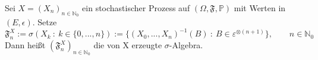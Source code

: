 Sei $X=(X_{n})_{n \in \mathbb{N}_{0}}$ ein stochastischer Prozess auf $(\Omega,\mathfrak{F},\mathbb{P})$ mit Werten in $(E,\epsilon)$. Setze
\begin{equation*}
\mathfrak{F}_{n}^{X} := \sigma(X_{k} \: : \: k \in \lbrace 0,...,n \rbrace) := \lbrace (X_{0},...,X_{n})^{-1}(B) \: : \: B \in  \varepsilon^{ \otimes (n+1)} \rbrace, \qquad n \in \mathbb{N}_{0} 
\end{equation*}
Dann heißt $(\mathfrak{F}_{n}^{X})_{n \in \mathbb{N}_{0}}$ die von X erzeugte $\sigma$-Algebra.